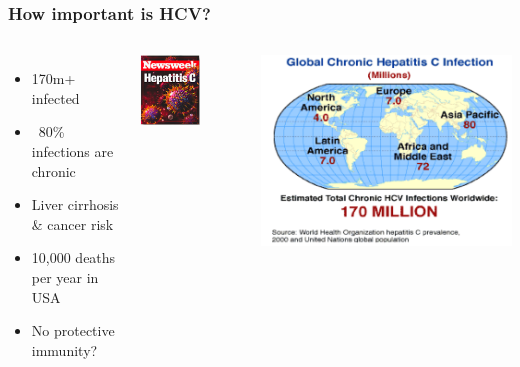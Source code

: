 \begin{frame}
\frametitle{How important is HCV?}

\begin{columns}[t]


\footnotesize{
\begin{itemize}
	\item 170m+ infected
	\item ~80\% infections are chronic
	\item Liver cirrhosis \& cancer risk
	\item 10,000 deaths per year in USA
	\item No protective immunity?
\end{itemize}
}

\includegraphics[width=0.6\textwidth]{../../images/Cover}


\includegraphics[width=\textwidth]{../../images/GlobeHCV}

\end{columns}

\end{frame}
